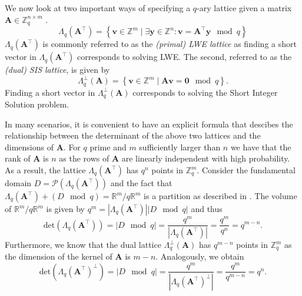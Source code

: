 We now look at two important ways of specifying a $q$-ary lattice given a matrix $\mathbf{A} \in \mathbb{Z}_q^{n\times m}$ \cite{BBGS19}.\begin{equation}\label{eq:lwe-lattice}
    \Lambda_q(\mathbf{A}^\intercal) = \left\{ \mathbf{v} \in \mathbb{Z}^m \mid \exists \mathbf{y} \in \mathbb{Z}^n : \mathbf{v} = \mathbf{A}^\intercal \mathbf{y} \mod q \right\}
\end{equation}
$\Lambda_q(\mathbf{A}^\intercal)$ is commonly referred to as the \textit{(primal) LWE lattice} as finding a short vector in $\Lambda_q(\mathbf{A}^\intercal)$ corresponds to solving LWE. The second, referred to as the \textit{(dual) SIS lattice}, is given by
\begin{equation}\label{eq:sis-lattice}
    \Lambda_q^\perp(\mathbf{A}) = \left\{ \mathbf{v} \in \mathbb{Z}^m \mid  \mathbf{A}\mathbf{v} = \mathbf{0} \mod q \right\}.
\end{equation}
Finding a short vector in $\Lambda_q^\perp(\mathbf{A})$ corresponds to solving the Short Integer Solution problem.


In many scenarios, it is convenient to have an explicit formula that descibes the relationship between the determinant of the above two lattices and the dimensions of $\mathbf{A}$. For $q$ prime and $m$ sufficiently larger than $n$ we have that the rank of $\mathbf{A}$ is $n$ as the rows of $\mathbf{A}$ are linearly independent with high probability. As a result, the lattice $\Lambda_q(\mathbf{A}^\intercal)$ has $q^n$ points in $\mathbb{Z}_q^m$.
Consider the fundamental domain $D = \mathcal{P}(\Lambda_q(\mathbf{A}^\intercal))$ and the fact that $\Lambda_q(\mathbf{A}^\intercal) + (D \mod q) = \mathbb{R}^m/q\mathbb{R}^m$ is a partition as described in \cite{volume-lattice}. The volume of $\mathbb{R}^m/q\mathbb{R}^m$ is given by $q^m =|\Lambda_q(\mathbf{A}^\intercal)||D \mod q|$ and thus
\begin{equation}\label{eq:det-MR}
    \text{det}(\Lambda_q(\mathbf{A}^\intercal)) = |D \mod q| = \frac{q^m}{|\Lambda_q(\mathbf{A}^\intercal)|} = \frac{q^{m}}{q^{n}} = q^{m-n}.
\end{equation}
Furthermore, we know that the dual lattice  $\Lambda_q^\perp(\mathbf{A})$ has $q^{m-n}$ points in $\mathbb{Z}_q^m$ as the dimension of the kernel of $\mathbf{A}$ is $m-n$. Analogously, we obtain
\begin{equation}\label{eq:det-MR-dual}
    \text{det}(\Lambda_q(\mathbf{A}^\intercal)^{\perp}) = |D \mod q| = \frac{q^m}{|\Lambda_q(\mathbf{A}^\intercal)^{\perp}|} = \frac{q^{m}}{q^{m-n}} = q^n.
\end{equation}


